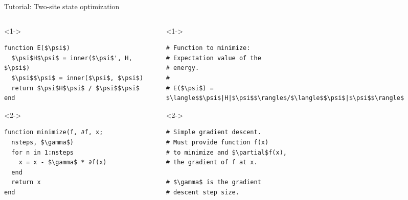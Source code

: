 \begin{frame}[fragile]{Tutorial: Two-site state optimization}


\begin{columns}

\begin{column}{5cm}

\begin{onlyenv}<1->

\begin{lstlisting}[language=JuliaLocal, style=julia, mathescape, basicstyle=\small]
function E($\psi$)
  $\psi$H$\psi$ = inner($\psi$', H, $\psi$)
  $\psi$$\psi$ = inner($\psi$, $\psi$)
  return $\psi$H$\psi$ / $\psi$$\psi$
end
\end{lstlisting}

\end{onlyenv}

\begin{onlyenv}<2->

\begin{lstlisting}[language=JuliaLocal, style=julia, mathescape, basicstyle=\small]
function minimize(f, ∂f, x;
  nsteps, $\gamma$)
  for n in 1:nsteps
    x = x - $\gamma$ * ∂f(x)
  end
  return x
end
\end{lstlisting}

\end{onlyenv}

\end{column}

\begin{column}{5cm}

\begin{onlyenv}<1->

\begin{lstlisting}[style=julia, numbers=none, mathescape, basicstyle=\small]
# Function to minimize:
# Expectation value of the
# energy.
#
# E($\psi$) = $\langle$$\psi$|H|$\psi$$\rangle$/$\langle$$\psi$|$\psi$$\rangle$
\end{lstlisting}

\end{onlyenv}

\begin{onlyenv}<2->

\begin{lstlisting}[style=julia, numbers=none, mathescape, basicstyle=\small]
# Simple gradient descent.
# Must provide function f(x)
# to minimize and $\partial$f(x),
# the gradient of f at x.

# $\gamma$ is the gradient
# descent step size.
\end{lstlisting}

\end{onlyenv}

\end{column}

\end{columns}

\end{frame}
